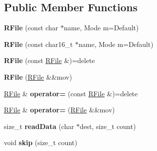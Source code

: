 \subsection*{Public Member Functions}
\begin{DoxyCompactItemize}
\item 
\hypertarget{class_tempest_1_1_r_file_ab5c3a87e98e0ff7488c6d38d6ff595ab}{{\bfseries R\+File} (const char $\ast$name, Mode m=Default)}\label{class_tempest_1_1_r_file_ab5c3a87e98e0ff7488c6d38d6ff595ab}

\item 
\hypertarget{class_tempest_1_1_r_file_ab290c831c1c08fa5724a823eed8a5f7b}{{\bfseries R\+File} (const char16\+\_\+t $\ast$name, Mode m=Default)}\label{class_tempest_1_1_r_file_ab290c831c1c08fa5724a823eed8a5f7b}

\item 
\hypertarget{class_tempest_1_1_r_file_a231540a5c11781611fad457a0ea758be}{{\bfseries R\+File} (const \hyperlink{class_tempest_1_1_r_file}{R\+File} \&)=delete}\label{class_tempest_1_1_r_file_a231540a5c11781611fad457a0ea758be}

\item 
\hypertarget{class_tempest_1_1_r_file_abd7ebd0a9fd1a895df80ddfc49035194}{{\bfseries R\+File} (\hyperlink{class_tempest_1_1_r_file}{R\+File} \&\&mov)}\label{class_tempest_1_1_r_file_abd7ebd0a9fd1a895df80ddfc49035194}

\item 
\hypertarget{class_tempest_1_1_r_file_a355a09502405742121ae602a992030ae}{\hyperlink{class_tempest_1_1_r_file}{R\+File} \& {\bfseries operator=} (const \hyperlink{class_tempest_1_1_r_file}{R\+File} \&)=delete}\label{class_tempest_1_1_r_file_a355a09502405742121ae602a992030ae}

\item 
\hypertarget{class_tempest_1_1_r_file_a47b1ab8e73e0c590a8427996f2ba982c}{\hyperlink{class_tempest_1_1_r_file}{R\+File} \& {\bfseries operator=} (\hyperlink{class_tempest_1_1_r_file}{R\+File} \&\&mov)}\label{class_tempest_1_1_r_file_a47b1ab8e73e0c590a8427996f2ba982c}

\item 
\hypertarget{class_tempest_1_1_r_file_ac67a343d68502b4c316d5c6fd87888b8}{size\+\_\+t {\bfseries read\+Data} (char $\ast$dest, size\+\_\+t count)}\label{class_tempest_1_1_r_file_ac67a343d68502b4c316d5c6fd87888b8}

\item 
\hypertarget{class_tempest_1_1_r_file_aef3cdb674c82ed79d8b9e4e276c4ec3f}{void {\bfseries skip} (size\+\_\+t count)}\label{class_tempest_1_1_r_file_aef3cdb674c82ed79d8b9e4e276c4ec3f}


\end{DoxyCompactItemize}
